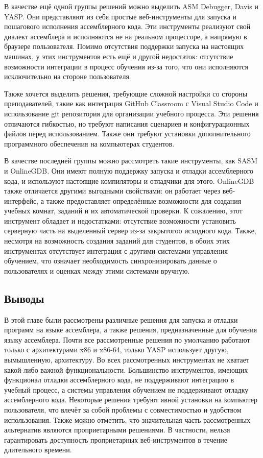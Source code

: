 \documentclass[a4paper,article,14pt]{extarticle}
\begin{document}
В качестве ещё одной группы решений можно выделить ASM Debugger, Davis и YASP. Они представляют из себя простые веб-инструменты для запуска и пошагового исполнения ассемблерного кода. Эти инструменты реализуют свой диалект ассемблера и исполняются не на реальном процессоре, а напрямую в браузере пользователя. Помимо отсутствия поддержки запуска на настоящих машинах, у этих инструментов есть ещё и другой недостаток: отсутствие возможности интеграции в процесс обучения из-за того, что они исполняются исключительно на стороне пользователя.

Также хочется выделить решения, требующие сложной настройки со стороны преподавателей, такие как интеграция GitHub Classroom с Visual Studio Code и использование git репозитория для организации учебного процесса. Эти решения отличаются гибкостью, но требуют написания сценариев и конфигурационных файлов перед использованием. Также они требуют установки дополнительного программного обеспечения на компьютерах студентов.

В качестве последней группы можно рассмотреть такие инструменты, как SASM и OnlineGDB. Они имеют полную поддержку запуска и отладки ассемблерного кода, и используют настоящие компиляторы и отладчики для этого. OnlineGDB также отличается другими выгодными свойствами: он работает через веб-интерфейс, а также предоставляет определённые возможности для создания учебных комнат, заданий и их автоматической проверки. К сожалению, этот инструмент обладает и недостатками: отсутствие возможности установить серверную часть на выделенный сервер из-за закрытогоо исходного кода. Также, несмотря на возможность создания заданий для студентов, в обоих этих инструментах отсутствует интеграция с другими системами управления обучением, что означает необходимость синхронизировать данные о пользователях и оценках между этими системами вручную.

\subsection{Выводы}

В этой главе были рассмотрены различные решения для запуска и отладки программ на языке ассемблера, а также решения, предназначенные для обучения языку ассемблера. Почти все рассмотренные решения по умолчанию работают только с архитектурами x86 и x86-64, только YASP использует другую, вымышленную, архитектуру. Во всех рассмотренных инструментах не хватает какой-либо важной функциональности. Большинство инструментов, имеющих функционал отладки ассемблерного кода, не поддерживают интеграцию в учебный процесс, а системы управления обучением не поддерживают отладку ассемблерного кода. Некоторые решения требуют явной установки на компьютер пользователя, что влечёт за собой проблемы с совместимостью и удобством использования. Также можно отметить, что значительная часть рассмотренных альтернатив являются проприетарными решениями. В частности, нельзя гарантировать доступность проприетарных веб-инструментов в течение длительного времени.
\end{document}
